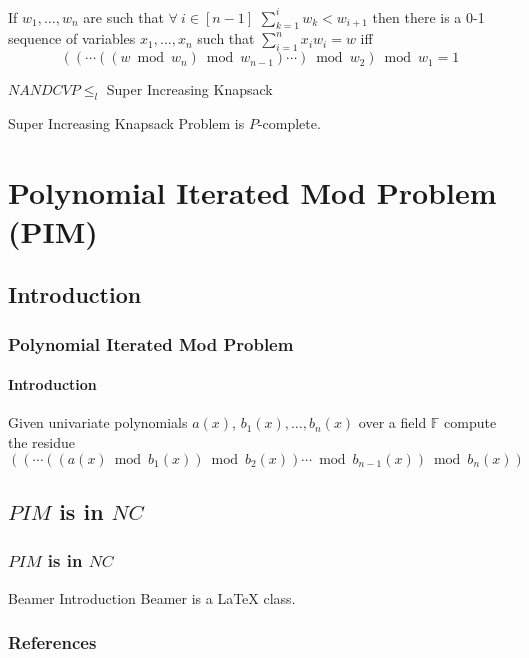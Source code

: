\documentclass[article,10pt]{beamer}%
\newcommand{\bbF}{\mathbb{F}}
\begin{document}
\begin{frame}[allowframebreaks]
\begin{theorem}
	If $w_1,\dots, w_n$ are such that $\forall \ i\in [n-1]$ $\sum\limits_{k=1}^{i}w_k<w_{i+1}$ then there is a 0-1 sequence of variables $x_1,\dots, x_n$ such that $\sum\limits_{i=1}^nx_iw_i=w$ iff $$((\cdots((w\bmod{w_n})\bmod{w_{n-1}})\cdots )\bmod{w_2})\bmod{w_1}=1$$
\end{theorem}
\framebreak

\begin{theorem}
	$NANDCVP\leq_l$ Super Increasing Knapsack
\end{theorem}
\begin{theorem}
	Super Increasing Knapsack Problem is $P$-complete.
\end{theorem}
\end{frame}

\section{Polynomial Iterated Mod Problem (PIM)}
\subsection{Introduction}
\begin{frame}
\frametitle{Polynomial Iterated Mod Problem}
\framesubtitle{Introduction}
\begin{definition}
	Given univariate polynomials $a(x)$, $b_1(x),\dots, b_n(x)$ over a field $\bbF$ compute the residue $((\cdots ((a(x)\bmod{b_1(x)})\bmod{b_2(x)})\cdots\bmod{b_{n-1}(x)})\bmod{b_{n}(x)})$
\end{definition}
\end{frame}

\subsection{$PIM$ is in $NC$}
\begin{frame}
\frametitle{$PIM$ is in $NC$}

\begin{block}{Beamer Introduction}
Beamer is a { \LaTeX} class.
\end{block}

\end{frame}


\begin{frame}%
\frametitle{References}
\printbibliography
\end{frame}
\end{document}
